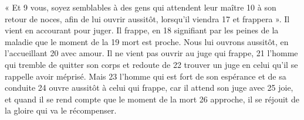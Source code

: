 « Et	 
9	 	vous, soyez semblables à des gens qui attendent leur maître	 
10	 	à son retour de noces, afin de lui ouvrir aussitôt, lorsqu'il viendra	 
17	 	et frappera ». Il vient en accourant pour juger. Il frappe, en	 
18	 	signifiant par les peines de la maladie que le moment de la	 
19	 	mort est proche. Nous lui ouvrons aussitôt, en l'accueillant	 
20	 	avec amour. Il ne vient pas ouvrir au juge qui frappe,	 
21	 	l'homme qui tremble de quitter son corps et redoute de	 
22	 	trouver un juge en celui qu'il se rappelle avoir méprisé. Mais	 
23	 	l'homme qui est fort de son espérance et de sa conduite	 
24	 	ouvre aussitôt à celui qui frappe, car il attend son juge avec	 
25	 	joie, et quand il se rend compte que le moment de la mort	 
26	 	approche, il se réjouit de la gloire qui va le récompenser.